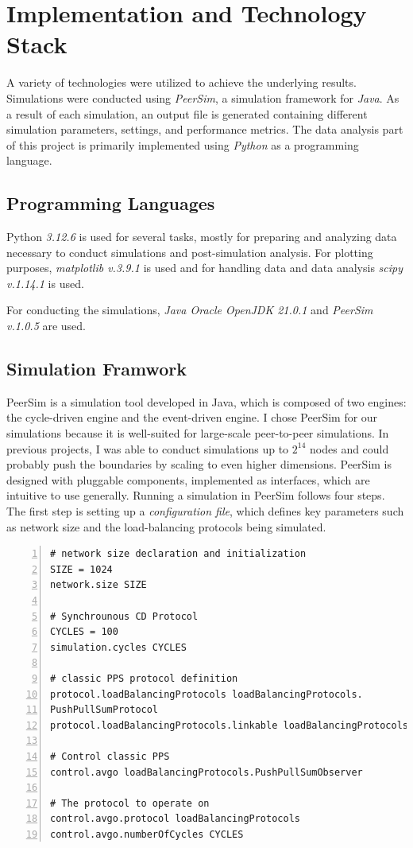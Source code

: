 \chapter{Implementation and Technology Stack}\label{chap:implementation}
A variety of technologies were utilized to achieve the underlying results. Simulations were conducted using \textit{PeerSim}, a simulation framework for \textit{Java}. As a result of each simulation, an output file is generated containing different simulation parameters, settings, and performance metrics. The data analysis part of this project is primarily implemented using \textit{Python} as a programming language.

\section{Programming Languages}\label{sec:proglangs}
Python \textit{3.12.6} is used for several tasks, mostly for preparing and analyzing data necessary to conduct simulations and post-simulation analysis. For plotting purposes, \textit{matplotlib v.3.9.1} is used and for handling data and data analysis \textit{scipy v.1.14.1} is used.

For conducting the simulations, \textit{Java Oracle OpenJDK 21.0.1} and \textit{PeerSim v.1.0.5} are used.

\section{Simulation Framwork}\label{sec:simulationframework}
PeerSim is a simulation tool developed in Java, which is composed of two engines: the cycle-driven engine and the event-driven engine. I chose PeerSim for our simulations because it is well-suited for large-scale peer-to-peer simulations. In previous projects, I was able to conduct simulations up to $2^{14}$ nodes and could probably push the boundaries by scaling to even higher dimensions. PeerSim is designed with pluggable components, implemented as interfaces, which are intuitive to use generally. Running a simulation in PeerSim follows four steps. The first step is setting up a \textit{configuration file}, which defines key parameters such as network size and the load-balancing protocols being simulated.

\begin{lstlisting}[caption=Example configuration, captionpos=b, numbers=left, label=lst:exampleConfig]
# network size declaration and initialization
SIZE = 1024
network.size SIZE

# Synchrounous CD Protocol
CYCLES = 100
simulation.cycles CYCLES

# classic PPS protocol definition
protocol.loadBalancingProtocols loadBalancingProtocols.
PushPullSumProtocol
protocol.loadBalancingProtocols.linkable loadBalancingProtocols

# Control classic PPS
control.avgo loadBalancingProtocols.PushPullSumObserver

# The protocol to operate on
control.avgo.protocol loadBalancingProtocols
control.avgo.numberOfCycles CYCLES
\end{lstlisting}

